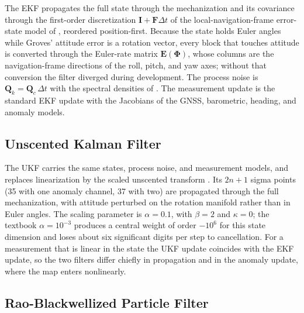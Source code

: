 The EKF propagates the full state through the mechanization and its covariance through the first-order discretization \(\mathbf{I} + \mathbf{F}\Delta t\) of the local-navigation-frame error-state model of \citet[Eqs.~14.63--14.71]{groves_ch14}, reordered position-first. Because the state holds Euler angles while Groves' attitude error is a rotation vector, every block that touches attitude is converted through the Euler-rate matrix \(\mathbf{E}(\bm{\Phi})\), whose columns are the navigation-frame directions of the roll, pitch, and yaw axes; without that conversion the filter diverged during development. The process noise is \(\mathbf{Q}_k = \mathbf{Q}_c\,\Delta t\) with the spectral densities of . The measurement update is the standard EKF update with the Jacobians of the GNSS, barometric, heading, and anomaly models.

\subsection{Unscented Kalman Filter}
\label{sec:ukf}

The UKF carries the same states, process noise, and measurement models, and replaces linearization by the scaled unscented transform \citep{ukf-1, ukf-2, ukf-4}. Its \(2n+1\) sigma points (35 with one anomaly channel, 37 with two) are propagated through the full mechanization, with attitude perturbed on the rotation manifold rather than in Euler angles. The scaling parameter is \(\alpha = 0.1\), with \(\beta = 2\) and \(\kappa = 0\); the textbook \(\alpha = 10^{-3}\) produces a central weight of order \(-10^{6}\) for this state dimension and loses about six significant digits per step to cancellation. For a measurement that is linear in the state the UKF update coincides with the EKF update, so the two filters differ chiefly in propagation and in the anomaly update, where the map enters nonlinearly.

\subsection{Rao-Blackwellized Particle Filter}
\label{sec:rbpf}

